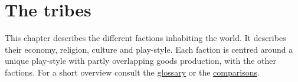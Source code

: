 \chapter{The tribes}\label{ch:Tribes}
This chapter describes the different factions inhabiting the world. It
describes their economy, religion, culture and play-style. Each faction is
centred around a unique play-style with partly overlapping goods production,
with the other factions. For a short overview consult the
\hyperref[ch:Tribes:Overview]{glossary} or the
\hyperref[ch:Tribes:Comparisons]{comparisons}.















\printglossary[type=tribe, title={Glossary}]{}\label{ch:Tribes:Overview}
